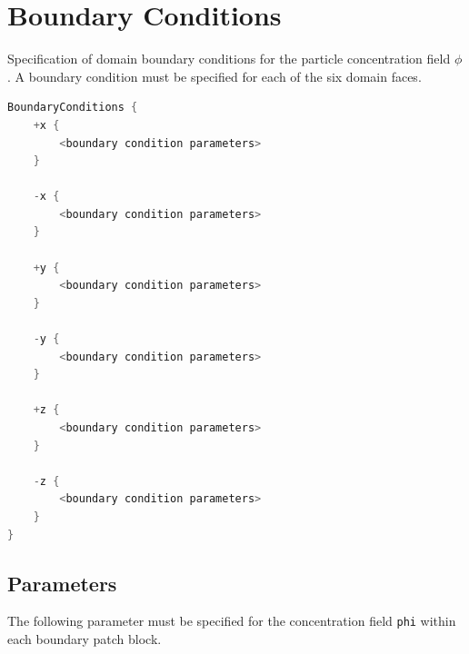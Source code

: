 \section{Boundary Conditions}

Specification of domain boundary conditions for the particle concentration field $\phi$. A boundary condition must be specified for each of the six domain faces.

\begin{lstlisting}[language=C++]
BoundaryConditions {
    +x {
        <boundary condition parameters>
    }

    -x {
        <boundary condition parameters>
    }

    +y {
        <boundary condition parameters>
    }

    -y {
        <boundary condition parameters>
    }

    +z {
        <boundary condition parameters>
    }

    -z {
        <boundary condition parameters>
    }
}
\end{lstlisting}

\subsection*{Parameters}
The following parameter must be specified for the concentration field \lstinline!phi! within each boundary patch block.

